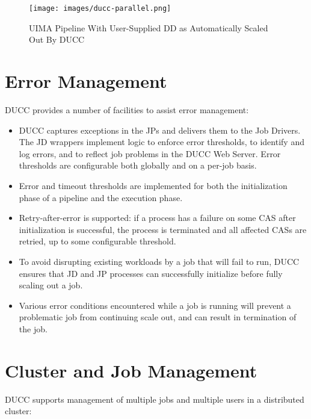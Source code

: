     \begin{figure}[H]
      \centering
      \texttt{[image: images/ducc-parallel.png]}
      \caption{UIMA Pipeline With User-Supplied DD as Automatically Scaled Out By DUCC}
      \label{fig:UIMA-AS-pipeline-DUCC-DD}
    \end{figure}

  
    \section{Error Management }
    DUCC provides a number of facilities to assist error management:
    
    \begin{itemize}
      \item DUCC captures exceptions in the JPs and delivers them
        to the Job Drivers. The JD wrappers implement logic to enforce error thresholds, to identify
        and log errors, and to reflect job problems in the DUCC Web Server.  Error thresholds are
        configurable both globally and on a per-job basis.

      \item Error and timeout thresholds are implemented for both the initialization phase of a pipeline
        and the execution phase.
    
      \item Retry-after-error is supported: if a process has a failure on some CAS after
        initialization is successful, the process is terminated and all affected CASs are retried, up to some
        configurable threshold.

      \item To avoid disrupting existing workloads by a job that will fail to run,
        DUCC ensures that JD and JP processes can successfully initialize before fully scaling out a job.

      \item Various error conditions encountered  while a job is running will prevent a problematic job
        from continuing scale out, and can result in termination of the job.
      \end{itemize}
      
    \section{Cluster and Job Management}
    DUCC supports  management of multiple jobs and multiple users in a distributed cluster:


